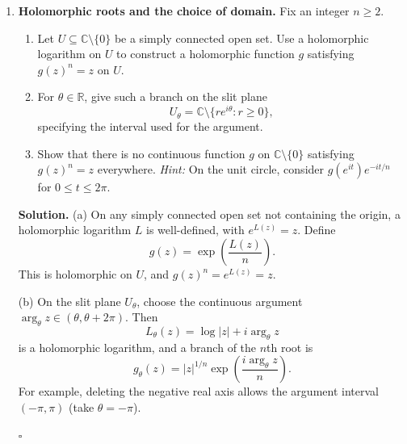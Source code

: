 \documentclass[12pt,reqno]{amsart}
\newcommand{\C}{\mathbb{C}}
\newcommand{\R}{\mathbb{R}}
\newenvironment{solution}
  {\par\smallskip\begin{tcolorbox}[breakable,enhanced,colback=solblue,colframe=solframe,
   boxrule=0.5pt,arc=2pt,left=6pt,right=6pt,top=4pt,bottom=4pt]\noindent\textbf{Solution.}}
  {\hfill$\square$\end{tcolorbox}\par\medskip}
\begin{document}
\begin{enumerate}
\begin{solution}
\noindent For $L_-$ the corresponding arguments are $3\pi/4$,
$-\pi/2$, and $-3\pi/4$. Hence
\begin{align*}
 L_-(-1+i)&=\tfrac12\log2+\tfrac{3\pi i}{4},\\
 \exp(iL_-(-i))&=\exp\bigl(i\cdot(-\tfrac{\pi i}{2})\bigr)
                  =e^{\pi/2},\\
 L_-(-1-i)&=\tfrac12\log2-\tfrac{3\pi i}{4}.
\end{align*}
The branches have the same argument on the upper half-plane.
On the lower half-plane the argument for $L_+$ is $2\pi$ greater
than the one for $L_-$. Therefore
\[
L_+(z)-L_-(z)=
\begin{cases}
0,&\operatorname{Im}z>0,\\
2\pi i,&\operatorname{Im}z<0.
\end{cases}
\]
\end{solution}

\item \textbf{Holomorphic roots and the choice of domain.}
Fix an integer $n\geq2$.
\begin{enumerate}
\item Let $U\subseteq\C\setminus\{0\}$ be a simply connected open
set. Use a holomorphic logarithm on $U$ to construct a holomorphic
function $g$ satisfying $g(z)^n=z$ on $U$.
\item For $\theta\in\R$, give such a branch on the slit plane
\[
 U_\theta=\C\setminus\{re^{i\theta}:r\geq0\},
\]
specifying the interval used for the argument.
\item Show that there is no continuous function $g$ on
$\C\setminus\{0\}$ satisfying $g(z)^n=z$ everywhere.
\emph{Hint:} On the unit circle, consider
$g(e^{it})e^{-it/n}$ for $0\leq t\leq2\pi$.
\end{enumerate}

\begin{solution}
\noindent (a) On any simply connected open set not containing the
origin, a holomorphic logarithm $L$ is well-defined, with $e^{L(z)}=z$.
Define
\[
\boxed{g(z)=\exp\left(\frac{L(z)}{n}\right).}
\]
This is holomorphic on $U$, and $g(z)^n=e^{L(z)}=z$.

\medskip
\noindent (b) On the slit plane $U_\theta$, choose the continuous
argument $\arg_\theta z\in(\theta,\theta+2\pi)$. Then
\[
L_\theta(z)=\log|z|+i\arg_\theta z
\]
is a holomorphic logarithm, and a branch of the $n$th root is
\[
\boxed{g_\theta(z)=|z|^{1/n}
                 \exp\left(\frac{i\arg_\theta z}{n}\right).}
\]
For example, deleting the negative real axis allows the argument
interval $(-\pi,\pi)$ (take $\theta=-\pi$).


\end{solution}
\end{enumerate}
\end{document}
